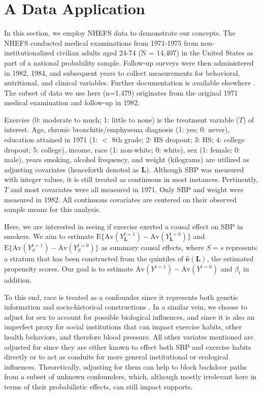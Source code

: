 \documentclass[12pt]{amsart}
\theoremstyle{plain}%
\theoremstyle{definition}
\theoremstyle{remark}
\numberwithin{equation}{section}
\begin{document}
\section{A Data Application}

In this section, we employ NHEFS data to demonstrate our concepts. The NHEFS conducted medical examinations from 1971-1975 from non-institutionalized civilian adults aged 24-74 (N = 14,407) in the United States as part of a national probability sample. Follow-up surveys were then administered in 1982, 1984, and subsequent years to collect measurements for behavioral, nutritional, and clinical variables. Further documentation is available elsewhere \cite{madans198610}. The subset of data we use here (n=1,479) originates from the original 1971 medical examination and follow-up in 1982.

Exercise (0: moderate to much; 1: little to none) is the treatment variable ($T$) of interest. Age, chronic bronchitis/emphysema diagnosis (1: yes; 0: never), education attained in 1971 (1: $<$  8th grade; 2: HS dropout; 3: HS; 4: college dropout; 5: college), income, race (1: non-white; 0: white), sex (1: female; 0: male), years smoking, alcohol frequency, and weight (kilograms) are utilized as adjusting covariates (henceforth denoted as $\mathbf{L}$). Although SBP was measured with integer values, it is still treated as continuous in most instances. Pertinently, $T$ and most covariates were all measured in 1971. Only SBP and weight were measured in 1982. All continuous covariates are centered on their observed sample means for this analysis.

Here, we are interested in seeing if exercise exerted a causal effect on SBP in smokers. We aim to estimate $\text{E} \{ \text{Av}(Y^{t=1}_{\mathbf{L}}) - \text{Av}(Y^{t=0}_{\mathbf{L}}) \}$ and $\text{E} \{ \text{Av}(Y^{t=1}_{S}) - \text{Av}(Y^{t=0}_{S}) \}$ as summary causal effects, where $S=s$ represents a stratum that has been constructed from the quintiles of $\mathbf{\hat{e}(L)}$, the estimated propensity scores. Our goal is to estimate $\text{Av}(Y^{t=1}) - \text{Av}(Y^{t=0})$ and $\beta_t$ in addition.

To this end, race is treated as a confounder since it represents both genetic information and socio-historical constructions \cite{witzig1996medicalization}. In a similar vein, we choose to adjust for sex to account for possible biological influences, and since it is also an imperfect proxy for social institutions that can impact exercise habits, other health behaviors, and therefore blood pressure. All other variates mentioned are adjusted for since they are either known to effect both SBP and exercise habits directly or to act as conduits for more general institutional or ecological influences. Theoretically, adjusting for them can help to block backdoor paths from a subset of unknown confounders, which, although mostly irrelevant here in terms of their probabilistic effects, can still impact supports.
\newline
\end{document}
